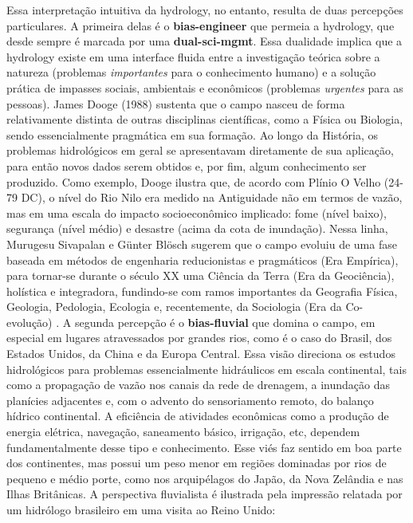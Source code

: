 \documentclass[./main.tex]{subfiles}
\begin{document}
\par Essa interpretação intuitiva da \gls{hydrology}, no entanto, resulta de duas percepções particulares. A primeira delas é o \textbf{\gls{bias-engineer}} que permeia a \gls{hydrology}, que desde sempre é marcada por uma \textbf{\gls{dual-sci-mgmt}}. Essa dualidade implica que a \gls{hydrology} existe em uma interface fluida entre a investigação teórica sobre a natureza (problemas \textit{importantes} para o conhecimento humano) e a solução prática de impasses sociais, ambientais e econômicos (problemas \textit{urgentes} para as pessoas). James Dooge (1988) \cite{Dooge1988} sustenta que o campo nasceu de forma relativamente distinta de outras disciplinas científicas, como a Física ou Biologia, sendo essencialmente pragmática em sua formação. Ao longo da História, os problemas hidrológicos em geral se apresentavam diretamente de sua aplicação, para então novos dados serem obtidos e, por fim, algum conhecimento ser produzido. Como exemplo, Dooge ilustra que, de acordo com Plínio O Velho (24-79 DC), o nível do Rio Nilo era medido na Antiguidade não em termos de vazão, mas em uma escala do impacto socioeconômico implicado: fome (nível baixo), segurança (nível médio) e desastre (acima da cota de inundação). Nessa linha, Murugesu Sivapalan e Günter Blösch sugerem que o campo evoluiu de uma fase baseada em métodos de engenharia reducionistas e pragmáticos (Era Empírica), para tornar-se durante o século XX uma Ciência da Terra (Era da Geociência), holística e integradora, fundindo-se com ramos importantes da Geografia Física, Geologia, Pedologia, Ecologia e, recentemente, da Sociologia (Era da Co-evolução) \cite{Sivapalan2017, Sivapalan2018}. A segunda percepção é o \textbf{\gls{bias-fluvial}} que domina o campo, em especial em lugares atravessados por grandes rios, como é o caso do Brasil, dos Estados Unidos, da China e da Europa Central. Essa visão direciona os estudos hidrológicos para problemas essencialmente hidráulicos em escala continental, tais como a propagação de vazão nos canais da rede de drenagem, a inundação das planícies adjacentes e, com o advento do sensoriamento remoto, do balanço hídrico continental. A eficiência de atividades econômicas como a produção de energia elétrica, navegação, saneamento básico, irrigação, etc, dependem fundamentalmente desse tipo e conhecimento. Esse viés faz sentido em boa parte dos continentes, mas possui um peso menor em regiões dominadas por rios de pequeno e médio porte, como nos arquipélagos do Japão, da Nova Zelândia e nas Ilhas Britânicas. A perspectiva fluvialista é ilustrada pela impressão relatada por um hidrólogo brasileiro em uma visita ao Reino Unido:
\end{document}
